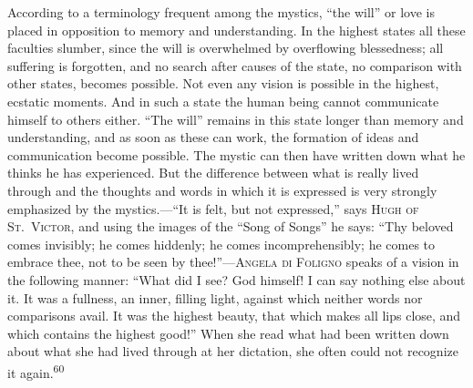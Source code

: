 \documentclass[12pt,a4paper]{book}
\begin{document}
According to a terminology frequent among the mystics, ``the will'' or love is placed in opposition
to memory and understanding. In the highest states all these faculties slumber, since the will is
overwhelmed by overflowing blessedness; all suffering is forgotten, and no search after causes of
the state, no comparison with other states, becomes possible. Not even any vision is possible in
the highest, ecstatic moments. And in such a state the human being cannot communicate himself to
others either. ``The will'' remains in this state longer than memory and understanding, and as soon
as these can work, the formation of ideas and communication become possible. The mystic can then
have written down what he thinks he has experienced. But the difference between what is really
lived through and the thoughts and words in which it is expressed is very strongly emphasized by
the mystics.---``It is felt, but not expressed,'' says \textsc{Hugh of St.\ Victor}, and using the
images of the ``Song of Songs'' he says: ``Thy beloved comes invisibly; he comes hiddenly; he comes
incomprehensibly; he comes to embrace thee, not to be seen by thee!''---\textsc{Angela di Foligno}
speaks of a vision in the following manner: ``What did I see? God himself! I can say nothing else
about it. It was a fullness, an inner, filling light, against which neither words nor comparisons
avail. It was the highest beauty, that which makes all lips close, and which contains the highest
good!'' When she read what had been written down about what she had lived through at her dictation,
she often could not recognize it again.\textsuperscript{60}
\end{document}
